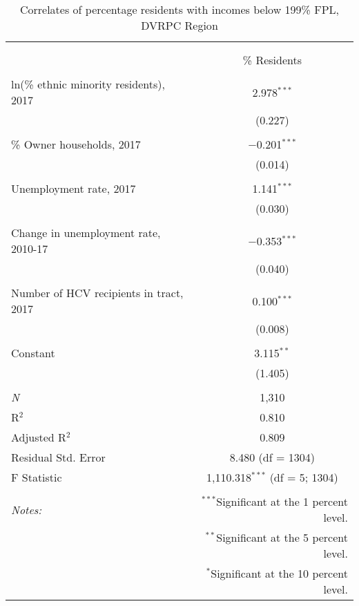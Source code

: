 \documentclass[paper=letterpaper, fontsize=11pt]{scrartcl}
\begin{document}
\begin{table}[!htbp] \centering 
	\caption{Correlates of percentage residents with incomes below 199\% FPL, DVRPC Region} 
		\label{} 
		\begin{tabular}{@{\extracolsep{5pt}}lc} 
			\\[-1.8ex]\hline 
			\hline \\[-1.8ex] 
			\\[-1.8ex] & \% Residents \\ 
			\hline \\[-1.8ex] 
			ln(\% ethnic minority residents), 2017 & 2.978$^{***}$ \\ 
			& (0.227) \\ 
			& \\ 
			\% Owner households, 2017 & $-$0.201$^{***}$ \\ 
			& (0.014) \\ 
			& \\ 
			Unemployment rate, 2017 & 1.141$^{***}$ \\ 
			& (0.030) \\ 
			& \\ 
			Change in unemployment rate, 2010-17 & $-$0.353$^{***}$ \\ 
			& (0.040) \\ 
			& \\ 
			Number of HCV recipients in tract, 2017 & 0.100$^{***}$ \\ 
			& (0.008) \\ 
			& \\ 
			Constant & 3.115$^{**}$ \\ 
			& (1.405) \\ 
			& \\ 
			\textit{N} & 1,310 \\ 
			R$^{2}$ & 0.810 \\ 
			Adjusted R$^{2}$ & 0.809 \\ 
			Residual Std. Error & 8.480 (df = 1304) \\ 
			F Statistic & 1,110.318$^{***}$ (df = 5; 1304) \\ 
			\hline 
			\hline \\[-1.8ex] 
			\textit{Notes:} & \multicolumn{1}{r}{$^{***}$Significant at the 1 percent level.} \\ 
			& \multicolumn{1}{r}{$^{**}$Significant at the 5 percent level.} \\ 
			& \multicolumn{1}{r}{$^{*}$Significant at the 10 percent level.} \\ 
		\end{tabular} 
	\end{table}
\end{document}
